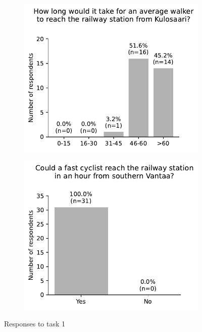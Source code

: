 \begin{appendices}
\begin{figure}[H]
	\centering
	\begin{subfigure}[b]{0.5\textwidth}
		\centering
		\includegraphics[width=\textwidth]{visual/figures/survey/0.pdf}
	\end{subfigure}%
	\hfill
	\begin{subfigure}[b]{0.5\textwidth}
		\centering
		\includegraphics[width=\textwidth]{visual/figures/survey/1.pdf}
	\end{subfigure}%
	\caption{Responses to task 1}
	\label{fig:task 1}
\end{figure}


\end{appendices}

